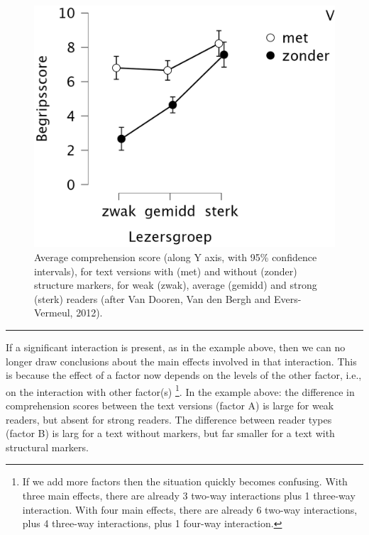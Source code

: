 \documentclass[
]{book}
\begin{document}
\begin{figure}
\centering
\includegraphics{figures/DBE2012interaction_v2.png}
\caption{\label{fig:DBE12interaction}Average comprehension score (along Y axis, with 95\% confidence intervals), for text versions with (met) and without (zonder) structure markers, for weak (zwak), average (gemidd) and strong (sterk) readers (after Van Dooren, Van den Bergh and Evers-Vermeul, 2012).}
\end{figure}

\begin{center}\rule{0.5\linewidth}{0.5pt}\end{center}

If a significant interaction is present, as in the example above, then we can no longer draw conclusions about the main effects involved in that interaction. This is because the effect of a factor now depends on the levels of the other factor, i.e., on the interaction with other factor(s) \footnote{If we add more factors then the situation quickly becomes confusing.
  With three main effects, there are already 3 two-way interactions plus 1 three-way
  interaction. With four main effects, there are already 6 two-way interactions, plus
  4 three-way interactions, plus 1 four-way interaction.}.
In the example above: the difference in comprehension scores between the text versions (factor A) is large for weak readers, but absent for strong readers. The difference between reader types (factor B) is larg for a text without markers, but far smaller for a text with structural markers.
\end{document}
